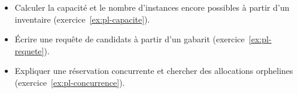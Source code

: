 \begin{savoirfaire}
\begin{itemize}
  \item Calculer la capacité et le nombre d'instances encore possibles à partir d'un inventaire
        (exercice~\ref{ex:pl-capacite}).
  \item Écrire une requête de candidats à partir d'un gabarit (exercice~\ref{ex:pl-requete}).
  \item Expliquer une réservation concurrente et chercher des allocations orphelines
        (exercice~\ref{ex:pl-concurrence}).
\end{itemize}
\end{savoirfaire}
